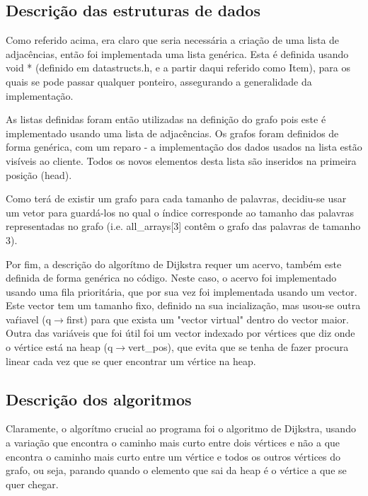 \documentclass[a4paper, 11pt]{article}
\begin{document}
\subsection{Descrição das estruturas de dados}
    \par Como referido acima, era claro que seria necessária a criação de uma lista de adjacências, então foi implementada uma lista genérica. Esta é definida usando void * (definido em datastructs.h, e a partir daqui referido como Item), para os quais se pode passar qualquer ponteiro, assegurando a generalidade da implementação.
    \par As listas definidas foram então utilizadas na definição do grafo pois este é implementado usando uma lista de adjacências. Os grafos foram definidos de forma genérica, com um reparo - a implementação dos dados usados na lista estão visíveis ao cliente. Todos os novos elementos desta lista são inseridos na primeira posição (head).
    \par Como terá de existir um grafo para cada tamanho de palavras, decidiu-se usar um vetor para guardá-los no qual o índice corresponde ao tamanho das palavras representadas no grafo (i.e. all{\_}arrays[3] contêm o grafo das palavras de tamanho 3).
    \par Por fim, a descrição do algorítmo de Dijkstra requer um acervo, também este definida de forma genérica no código. Neste caso, o acervo foi implementado usando uma fila prioritária, que por sua vez foi implementada usando um vector. Este vector tem um tamanho fixo, definido na sua incialização, mas usou-se outra vaŕiavel (q$\rightarrow$first) para que exista um "vector virtual"  dentro do vector maior. Outra das variáveis que foi útil foi um vector indexado por vértices que diz onde o vértice está na heap (q$\rightarrow$vert{\_}pos), que evita que se tenha de fazer procura linear cada vez que se quer encontrar um vértice na heap.
    
\subsection{Descrição dos algoritmos}
    \par Claramente, o algorítmo crucial ao programa foi o algoritmo de Dijkstra, usando a variação que encontra o caminho mais curto entre dois vértices e não a que encontra o caminho mais curto entre um vértice e todos os outros vértices do grafo, ou seja, parando quando o elemento que sai da heap é o vértice a que se quer chegar.
\end{document}
